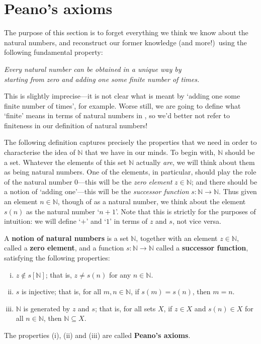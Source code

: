 \section{Peano's axioms}

The purpose of this section is to forget everything we think we know about the natural numbers, and reconstruct our former knowledge (and more!)\ using the following fundamental property:

\begin{center}
\textit{Every natural number can be obtained in a unique way by\\
starting from zero and adding one some finite number of times.}
\end{center}

This is slightly imprecise---it is not clear what is meant by `adding one some finite number of times', for example. Worse still, we are going to define what `finite' means in terms of natural numbers in , so we'd better not refer to finiteness in our definition of natural numbers!

The following definition captures precisely the properties that we need in order to characterise the idea of $\mathbb{N}$ that we have in our minds. To begin with, $\mathbb{N}$ should be a set. Whatever the elements of this set $\mathbb{N}$ actually \textit{are}, we will think about them as being natural numbers. One of the elements, in particular, should play the role of the natural number $0$---this will be the \textit{zero element} $z \in \mathbb{N}$; and there should be a notion of `adding one'---this will be the \textit{successor function} $s : \mathbb{N} \to \mathbb{N}$. Thus given an element $n \in \mathbb{N}$, though of as a natural number, we think about the element $s(n)$ as the natural number `$n+1$'. Note that this is strictly for the purposes of intuition: we will define `$+$' and `$1$' in terms of $z$ and $s$, not vice versa.

\begin{definition}
\label{defNotionOfNaturalNumbers}
A \textbf{notion of natural numbers} is a set $\mathbb{N}$, together with an element $z \in \mathbb{N}$, called a \textbf{zero element}, and a function $s : \mathbb{N} \to \mathbb{N}$ called a \textbf{successor function}, satisfying the following properties:
\begin{enumerate}[(i)]
\item $z \not\in s[\mathbb{N}]$; that is, $z \ne s(n)$ for any $n \in \mathbb{N}$.
\item $s$ is injective; that is, for all $m,n \in \mathbb{N}$, if $s(m) = s(n)$, then $m=n$.
\item $\mathbb{N}$ is generated by $z$ and $s$; that is, for all sets $X$, if $z \in X$ and $s(n) \in X$ for all $n \in \mathbb{N}$, then $\mathbb{N} \subseteq X$.
\end{enumerate}
The properties (i), (ii) and (iii) are called \textbf{Peano's axioms}.
\end{definition}

